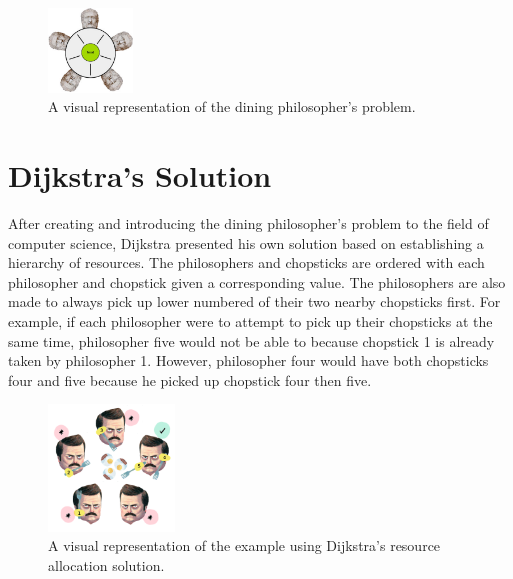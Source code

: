 \documentclass{article}
\begin{document}
\begin{figure}[H]
\begin{center}
\includegraphics[width=0.2\textwidth]{diningphilosophers.jpg}
\caption{A visual representation of the dining philosopher's problem.}
\end{center}
\end{figure}

\section{Dijkstra's Solution} After creating and introducing the dining philosopher's problem to the field of computer science, Dijkstra presented his own solution based on establishing a hierarchy of resources. The philosophers and chopsticks are ordered with each philosopher and chopstick given a corresponding value. The philosophers are also made to always pick up lower numbered of their two nearby chopsticks first. For example, if each philosopher were to attempt to pick up their chopsticks at the same time, philosopher five would not be able to because chopstick 1 is already taken by philosopher 1. However, philosopher four would have both chopsticks four and five because he picked up chopstick four then five.

\begin{figure}[H]
\begin{center}
\includegraphics[width=0.3\textwidth]{resource.png}
\caption{A visual representation of the example using Dijkstra's resource allocation solution.}
\end{center}
\end{figure}
\end{document}
